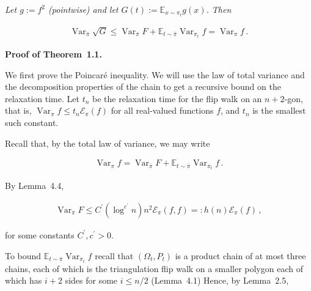 \documentclass[10pt,a4paper]{article}
\begin{document}
\emph{Let $g:=f^{2}$ (pointwise) and let $G(t):=\mathbb{E}_{x\sim\pi_{t}}g(x)$. Then}\par




\[\begin{gathered}
\operatorname{Var}_{\bar{\pi}}\sqrt{G}\leq\operatorname{Var}_{\bar{\pi}}F+\mathbb{E}_{t\sim\bar{\pi}}\operatorname{Var}_{\pi_{t}}f=\operatorname{Var}_{\pi}f\,.
\end{gathered}\]






\par\medskip\noindent\textbf{Proof of Theorem 1.1.}\par



We first prove the Poincaré inequality. We will use the law of total variance and the decomposition properties of the chain to get a recursive bound on the relaxation time. Let $t_{n}$ be the relaxation time for the flip walk on an $n+2$-gon, that is, $\operatorname{Var}_{\pi}f\leq t_{n}\mathcal{E}_{\pi}(f)$ for all real-valued functions $f$, and $t_{n}$ is the smallest such constant.\par




Recall that, by the total law of variance, we may write\par


\[\begin{gathered}
\operatorname{Var}_{\pi}f=\operatorname{Var}_{\overline{\pi}}F+\mathbb{E}_{t\sim\overline{\pi}}\operatorname{Var}_{\pi_{t}}f\,.
\end{gathered}\]


By Lemma 4.4,\par


\[\begin{gathered}
\operatorname{Var}_{\overline{\pi}}F\leq C^{\prime}(\log^{c^{\prime}}n)n^{2}\mathcal{E}_{\pi}(f,f)=:h(n)\mathcal{E}_{\pi}(f)\,,
\end{gathered}\]


for some constants $C^{\prime},c^{\prime}>0$.\par




To bound $\mathbb{E}_{t\sim\overline{\pi}}\operatorname{Var}_{\pi_{t}}f$ recall that $(\Omega_{t},P_{t})$ is a product chain of at most three chains, each of which is the triangulation flip walk on a smaller polygon each of which has $i+2$ sides for some $i\leq n/2$ (Lemma 4.1)
Hence, by Lemma 2.5,\par
\end{document}
